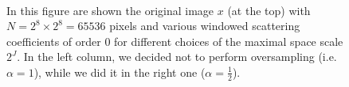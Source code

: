 \documentclass[12pt,a4paper]{article}
\theoremstyle{remark}
\begin{document}
\begin{figure}[H]
	\\
	\caption{In this figure are shown the original image $x$ (at the top) with $N = 2^8 \times 2^8 = 65536$ pixels and various windowed scattering coefficients of order $0$ for different choices of the maximal space scale $2^J$. In the left column, we decided not to perform oversampling (i.e. $\alpha =1$), while we did it in the right one ($\alpha = \frac{1}{2}$).}
\end{figure}
\end{document}
